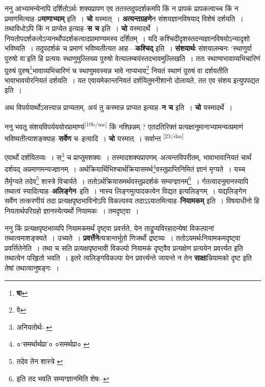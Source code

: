\documentclass[article,12pt,a4paper]{memoir}
\begin{document}
	  \pstart ननु आभ्यामन्येनापि दर्शितोऽर्थः शक्यप्रापण एव ततस्तदुपदर्शकमपि किं न प्रापकं प्रापकत्वाच्च किं न प्रमाणमित्याह--प्र\textbf{माणाभ्याम्} इति । \textbf{चो} यस्मात् । \textbf{अत्यन्तग्रहणे}न संशयज्ञानविषयाद् विशेषं दर्शयति । तथाविधोऽपि किं न प्राप्येत इत्याह--\textbf{स च} इति । \textbf{चो} यस्मादर्थे । नियतोपदर्शकत्वेऽप्यनर्थोपदर्शकत्वादप्रामाण्यमस्य दर्शितम् । यदि कश्चिदीदृशस्तदन्यज्ञानविषयोऽन्यादृशो भविष्यति । तदुपदर्शकं च प्रमाणं भविष्यतीत्यत आह—\textbf{कश्चिद्} इति । \textbf{संशयार्थः} संशयालम्बनः ‘स्थाणुर्वा पुरुषो वा’इति हि प्रत्ययः स्थाणुमुल्लिख्य पुरुषो वेत्यालम्बयंस्तदभावमुल्लिखति । ततः स्थाण्वभावाव्यभिचारिणं पुरुषं पुरुष\footnote{\textbf{षा}}भावाव्यभिचारिणं च स्थाणुमवस्यन्न भावे नाप्यभाव\footnote{वे} नियतं स्थाणं पुरुषं वा दर्शयतीति भावाभावयोरनियतं दर्शयति । यत एवायमेकान्तनियतं दर्शयितुमनीशानो दोलायते, तत एव संशय इत्युपपद्यत इति ।
	\pend
      

	  \pstart अथ विपर्ययार्थोऽसत्त्वान्न प्राप्यताम्, अयं तु कस्मान्न प्राप्यत इत्याह--\textbf{न च} इति । \textbf{चो} यस्मादर्थे ।
	\pend
      

	  \pstart ननु भवतु संशयविपर्यययोरप्रामाण्यं\leavevmode\textsuperscript{\rmlatinfont\tiny [10b/ms]} किं नश्छिन्नम् ? एतदतिरिक्तं प्रत्यक्षानुमानाभ्यामन्यत्प्रमाणं भविष्यतीत्याशङ्क्याह--\textbf{सर्वेण} च--इत्यादि । \textbf{चो} यस्मात् । सर्वान्त  \leavevmode\textsuperscript{\rmlatinfont\tiny [23/dm]} 
	  
	एवार्थो दर्शयितव्यः । स\footnote{अनियतोर्थः--\cite{dp-msD-n}} च प्राप्तुमशक्यः । तस्मादशक्यप्रापणम्--अत्यन्तविपरीतम्, भावाभावानियतं चार्थं दर्शयद् अप्रमाणमन्यज्ज्ञानम् । अर्थक्रियार्थिभिश्चार्थक्रियासमर्थ\footnote{०‘समर्थार्थप्रा’० \cite{dp-msA} \cite{dp-edH} \cite{dp-edP} \cite{dp-edN} ०समर्थप्रा० \cite{dp-msB} \cite{dp-edE}}वस्तुप्राप्तिनिमितं ज्ञानं मृग्यते । यच्च तैर्मृग्यते तदेव\footnote{तदेव तेन शास्त्रे \cite{dp-msB} \cite{dp-edH}} शास्त्रे विचार्यते । ततोऽर्थक्रियासमर्थवस्तुप्रदर्शकं सम्यग्ज्ञानम्\footnote{इति तद भवति सम्यग्ज्ञानमिति शेषः--\cite{dp-msD-n}} । र्गतत्वादनुमानस्यापि तथात्वं स्यादित्याह--\textbf{अलिङ्गेन}--इति । नास्य लिङ्गमुत्पादकत्वेन विद्यत इत्यलिङ्गम् । यद्यलिङ्गेन सर्वेण तत्करणीयं तदा प्रत्यक्षपृष्ठभाविनोऽपि विकल्पस्य तदाऽऽयातमित्याह--\textbf{नियामकम्} इति । विषयाधीनो हि नियतार्थपरिग्रहो ज्ञानस्येत्यर्थो नियामकः । तमदृष्ट्वा ।
	\pend
      

	  \pstart ननु किं प्रत्यक्षपृष्ठभाव्यपि नियामकमर्थं दृष्ट्वा प्रवर्त्तते, येन ताद्रूप्यविरहादन्येषां विकल्पानां तथात्वमाशङ्क्यते । उच्यते । \textbf{प्रवर्त्तेने}त्यत्रान्तर्भूतो णिजर्थो द्रष्टव्यः । ततोऽयमर्थःनियामकमदृष्ट्वा प्रवर्त्तितेनेति । तथा च सति प्रत्यक्षपृष्ठभावी विकल्पो नियामकं दृष्ट्वैव प्रत्यक्षेण प्रत्ययेन प्रवर्त्त्यत इति तथात्वेन परिहृतो भवति । इतरे त्वलिङ्गविकल्पा येन प्रवर्त्त्यन्ते जायन्ते न तेन \textbf{साक्षा}न्नियामको दृष्ट इति तेषां तथात्वानुषङ्गः ।
	\pend
      
\end{document}
